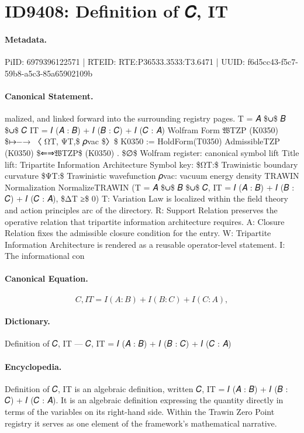 \section*{ID9408: Definition of 𝐶, IT}
\paragraph{Metadata.}
PiID: 6979396122571 | RTEID: RTE:P36533.3533:T3.6471 | UUID: f6d5cc43-f5c7-59b8-a5c3-85a65902109b

\paragraph{Canonical Statement.}
malized, and linked forward into the surrounding registry pages. T = 𝐴 \$∪\$ 𝐵 \$∪\$ 𝐶 IT = 𝐼 (𝐴 : 𝐵) + 𝐼 (𝐵 : 𝐶) + 𝐼 (𝐶 : 𝐴) Wolfram Form 𝔚TZP (K0350) \$↦−→ 〈 ΩT, ΨT,\$ 𝜌vac \$〉\$ K0350 := HoldForm(T0350) AdmissibleTZP (K0350) \$⇐⇒𝔚TZP\$ (K0350) . \$∅\$ Wolfram register: canonical symbol lift Title lift: Tripartite Information Architecture Symbol key: \$ΩT:\$ Trawinistic boundary curvature \$ΨT:\$ Trawinistic wavefunction 𝜌vac: vacuum energy density TRAWIN Normalization NormalizeTRAWIN (T = 𝐴 \$∪\$ 𝐵 \$∪\$ 𝐶, IT = 𝐼 (𝐴 : 𝐵) + 𝐼 (𝐵 : 𝐶) + 𝐼 (𝐶 : 𝐴), \$ΔT ≥\$ 0) T: Variation Law is localized within the field theory and action principles arc of the directory. R: Support Relation preserves the operative relation that tripartite information architecture requires. A: Closure Relation fixes the admissible closure condition for the entry. W: Tripartite Information Architecture is rendered as a reusable operator-level statement. I: The informational con

\paragraph{Canonical Equation.}
\[
𝐶, IT = 𝐼 (𝐴 : 𝐵) + 𝐼 (𝐵 : 𝐶) + 𝐼 (𝐶 : 𝐴),
\]

\paragraph{Dictionary.}
Definition of 𝐶, IT — 𝐶, IT = 𝐼 (𝐴 : 𝐵) + 𝐼 (𝐵 : 𝐶) + 𝐼 (𝐶 : 𝐴)

\paragraph{Encyclopedia.}
Definition of 𝐶, IT is an algebraic definition, written 𝐶, IT = 𝐼 (𝐴 : 𝐵) + 𝐼 (𝐵 : 𝐶) + 𝐼 (𝐶 : 𝐴). It is an algebraic definition expressing the quantity directly in terms of the variables on its right-hand side. Within the Trawin Zero Point registry it serves as one element of the framework's mathematical narrative.
